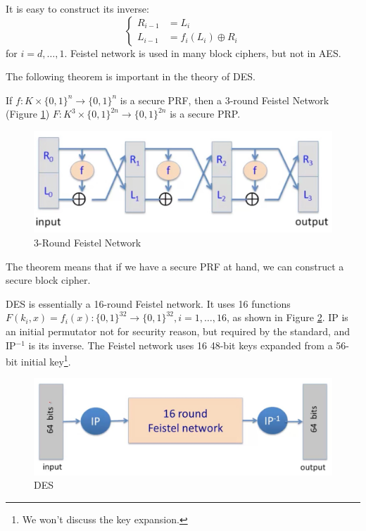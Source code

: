 It is easy to construct its inverse:
\begin{equation*}\begin{cases}
R_{i-1}&=L_i\\
L_{i-1}&=f_i(L_i)\oplus R_i
\end{cases}\end{equation*}
for $i=d,\dots,1$. Feistel network is used in many block ciphers, but not in AES.

The following theorem is important in the theory of DES. 
\begin{theorem}
If $f:K\times\{0,1\}^n\rightarrow\{0,1\}^n$ is a secure PRF, then a 3-round Feistel Network (Figure \ref{3rfeistel}) $F:K^3\times\{0,1\}^{2n}\rightarrow\{0,1\}^{2n}$ is a secure PRP.
\end{theorem}
\begin{figure}[ht]
\centering
\includegraphics[width=\textwidth]{3rfeistel.jpg}
\caption{3-Round Feistel Network}\label{3rfeistel}
\end{figure}
The theorem means that if we have a secure PRF at hand, we can construct a secure block cipher.

DES is essentially a 16-round Feistel network. It uses 16 functions $F(k_i,x)=f_i(x):\{0,1\}^{32}\rightarrow\{0,1\}^{32},i=1,\dots,16$, as shown in Figure \ref{des}. IP is an initial permutator not for security reason, but required by the standard, and IP$^{-1}$ is its inverse. The Feistel network uses 16 48-bit keys expanded from a 56-bit initial key\footnote{We won't discuss the key expansion.}.
\begin{figure}[ht]
\centering
\includegraphics[width=\textwidth]{DES.jpg}
\caption{DES}\label{des}
\end{figure}
